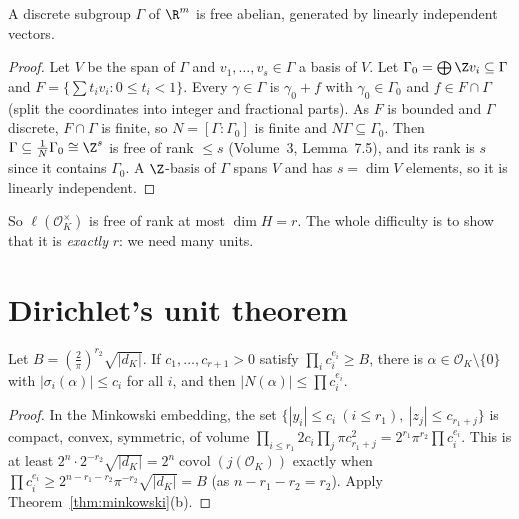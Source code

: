 \begin{lemma}\label{lem:discrete}
A discrete subgroup $\Gamma$ of $\R^m$ is free abelian, generated by linearly independent vectors.
\end{lemma}
\begin{proof}
Let $V$ be the span of $\Gamma$ and $v_1,\dots,v_s\in\Gamma$ a basis of $V$. Let $\Gamma_0=\bigoplus\Z v_i\subseteq\Gamma$
and $F=\{\sum t_iv_i:0\le t_i<1\}$. Every $\gamma\in\Gamma$ is $\gamma_0+f$ with $\gamma_0\in\Gamma_0$ and $f\in F\cap\Gamma$
(split the coordinates into integer and fractional parts). As $F$ is bounded and $\Gamma$ discrete, $F\cap\Gamma$ is finite, so
$N=[\Gamma:\Gamma_0]$ is finite and $N\Gamma\subseteq\Gamma_0$. Then $\Gamma\subseteq\frac1N\Gamma_0\cong\Z^s$ is free of rank
$\le s$ (Volume~3, Lemma~7.5), and its rank is $s$ since it contains $\Gamma_0$. A $\Z$-basis of $\Gamma$ spans $V$ and has
$s=\dim V$ elements, so it is linearly independent.
\end{proof}

So $\ell(\mathcal O_K^\times)$ is free of rank at most $\dim H=r$. The whole difficulty is to show that it is \emph{exactly}
$r$: we need many units.

\section{Dirichlet's unit theorem}

\begin{lemma}\label{lem:smallbox}
Let $B=(\frac2\pi)^{r_2}\sqrt{|d_K|}$. If $c_1,\dots,c_{r+1}>0$ satisfy $\prod_ic_i^{e_i}\ge B$, there is $\alpha\in\mathcal
O_K\setminus\{0\}$ with $|\sigma_i(\alpha)|\le c_i$ for all $i$, and then $|N(\alpha)|\le\prod c_i^{e_i}$.
\end{lemma}
\begin{proof}
In the Minkowski embedding, the set $\{|y_i|\le c_i\ (i\le r_1),\ |z_j|\le c_{r_1+j}\}$ is compact, convex, symmetric, of
volume $\prod_{i\le r_1}2c_i\prod_j\pi c_{r_1+j}^2=2^{r_1}\pi^{r_2}\prod c_i^{e_i}$. This is at least $2^n\cdot2^{-r_2}\sqrt{|d_K|}=
2^n\operatorname{covol}(j(\mathcal O_K))$ exactly when $\prod c_i^{e_i}\ge2^{n-r_1-r_2}\pi^{-r_2}\sqrt{|d_K|}=B$ (as
$n-r_1-r_2=r_2$). Apply Theorem~\ref{thm:minkowski}(b).
\end{proof}

